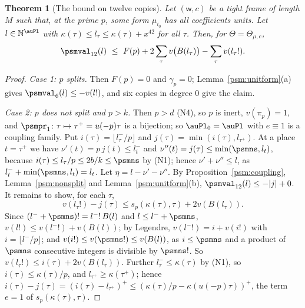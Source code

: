 \documentclass[10pt]{amsart}
\newtheorem{theorem}{Theorem}[section]
\theoremstyle{definition}
\theoremstyle{remark}
\newcommand{\N}{\mathbb N}
\begin{document}
\begin{theorem}[The bound on twelve copies]\label{psm:twelve}
Let $(\mathsf w,c)$ be a tight frame of length $M$ such that, at the prime $p$, some form
$\mu_{i_0}$ has all coefficients units. Let $l\in\N^{\auPl}$ with $\kappa(\tau)\le l_\tau\le
\kappa(\tau)+x^{42}$ for all $\tau$. Then, for $\Theta=\Theta_{\mu,c}$,
\[
\psmval_{12}(l)\ \le\ F(p)+2\sum_\tau v\bigl(B(l_\tau)\bigr)-\sum_\tau v(l_\tau!) .
\]
\end{theorem}
\begin{proof}
\emph{Case 1: $p$ splits.} Then $F(p)=0$ and $\gamma_p=0$; Lemma~\ref{psm:unitform}(a) gives
$\psmval_6(l)\le-v(l!)$, and six copies in degree $0$ give the claim.

\emph{Case 2: $p$ does not split and $p>k$.} Then $p>d$ (N4), so $p$ is inert, $v(\pi_p)=1$, and
$\psmpr_1\colon\tau\mapsto\tau^+=u(-p)\tau$ is a bijection; so $\auPl_0=\auPl$ with $e\equiv1$ is a
coupling family. Put $i(\tau)=\lfloor l_\tau^-/p\rfloor$ and $j(\tau)=\min(i(\tau),l_{\tau^+})$.
At a place $t=\tau^+$ we have $\nu'(t)=p\,j(t)\le l_t^-$ and $\nu''(t)=j(\tau)\le\min(\psmns,l_t)$,
because $i(\tau)\le l_\tau/p\le2b/k\le\psmns$ by (N1); hence $\nu'+\nu''\le l$, as
$l^-_t+\min(\psmns,l_t)=l_t$. Let $\eta=l-\nu'-\nu''$. By Proposition~\ref{psm:coupling},
Lemma~\ref{psm:nonsplit} and Lemma~\ref{psm:unitform}(b), $\psmval_{12}(l)\le-|j|+0$. It remains
to show, for each $\tau$,
\[
v(l_\tau!)-j(\tau)\le s_p(\kappa(\tau),\tau)+2v(B(l_\tau)).
\]
Since $(l^-+\psmns)!=l^-!\,B(l)$ and $l\le l^-+\psmns$, $v(l!)\le v(l^-!)+v(B(l))$; by Legendre,
$v(l^-!)=i+v(i!)$ with $i=\lfloor l^-/p\rfloor$; and $v(i!)\le v(\psmns!)\le v(B(l))$, as $i\le
\psmns$ and a product of $\psmns$ consecutive integers is divisible by $\psmns!$. So
$v(l_\tau!)\le i(\tau)+2v(B(l_\tau))$. Further $l_\tau^-\le\kappa(\tau)$ by (N1), so
$i(\tau)\le\kappa(\tau)/p$, and $l_{\tau^+}\ge\kappa(\tau^+)$; hence $i(\tau)-j(\tau)=(i(\tau)-
l_{\tau^+})^+\le(\kappa(\tau)/p-\kappa(u(-p)\tau))^+$, the term $e=1$ of $s_p(\kappa(\tau),\tau)$.


\end{proof}
\end{document}
